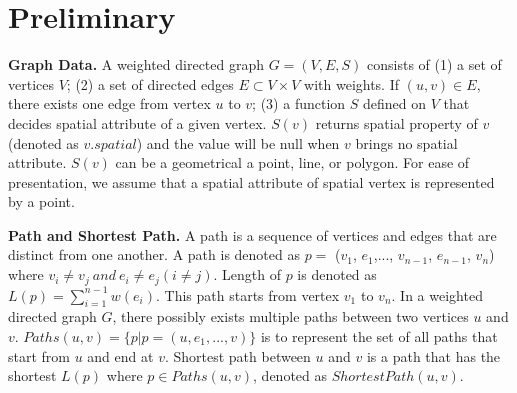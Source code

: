 \section{Preliminary}
\label{sec:preliminary}


{\bf Graph Data.} A weighted directed graph $G=(V,E,S)$ consists of (1) a set of vertices $V$; (2) a set of directed edges $E\subset V\times V$ with weights. If $(u,v)\in E$, there exists one edge from vertex $u$ to $v$; (3) a function $S$ defined on $V$ that decides spatial attribute of a given vertex. $S(v)$ returns spatial property of $v$ (denoted as $v.spatial$) and the value will be null when $v$ brings no spatial attribute. $S(v)$ can be a geometrical a point, line, or polygon. For ease of presentation, we assume that a spatial attribute of spatial vertex is represented by a point.

\textbf{Path and Shortest Path.} A path is a sequence of vertices and edges that are distinct from one another. A path is denoted as $p =$ ($v_1$, $e_1$,..., $v_{n-1}$, $e_{n-1}$, $v_n$) where $v_i\neq v_j~and~e_i\neq e_j (i\neq j)$. Length of $p$ is denoted as $L(p) = \sum\limits_{i = 1}^{n-1}w(e_i)$. This path starts from vertex $v_1$ to $v_n$. In a weighted directed graph $G$, there possibly exists multiple paths between two vertices $u$ and $v$. $Paths(u,v) = \{p|p = (u,e_1,..., v)\}$ is to represent the set of all paths that start from $u$ and end at $v$. Shortest path between $u$ and $v$ is a path that has the shortest $L(p)$ where $p\in Paths(u,v)$, denoted as $ShortestPath(u,v)$.

